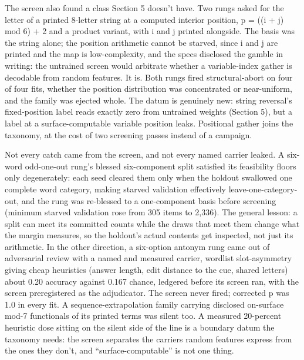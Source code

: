 The screen also found a class Section 5 doesn't have. Two rungs asked
for the letter of a printed 8-letter string at a computed interior
position, p = ((i + j) mod 6) + 2 and a product variant, with i and j
printed alongside. The basis was the string alone; the position
arithmetic cannot be starved, since i and j are printed and the map
is low-complexity, and the specs disclosed the gamble in writing: the
untrained screen would arbitrate whether a variable-index gather is
decodable from random features. It is. Both rungs fired
structural-abort on four of four fits, whether the position
distribution was concentrated or near-uniform, and the family was
ejected whole. The datum is genuinely new: string reversal's
fixed-position label reads exactly zero from untrained weights
(Section 5), but a label at a surface-computable variable position
leaks. Positional gather joins the taxonomy, at the cost of two
screening passes instead of a campaign.

Not every catch came from the screen, and not every named carrier
leaked. A six-word odd-one-out rung's blessed six-component split
satisfied its feasibility floors only degenerately: each seed cleared
them only when the holdout swallowed one complete word category,
making starved validation effectively leave-one-category-out, and the
rung was re-blessed to a one-component basis before screening
(minimum starved validation rose from 305 items to 2,336). The
general lesson: a split can meet its committed counts while the draws
that meet them change what the margin measures, so the holdout's
actual contents get inspected, not just its arithmetic. In the other
direction, a six-option antonym rung came out of adversarial review
with a named and measured carrier, wordlist slot-asymmetry giving
cheap heuristics (answer length, edit distance to the cue, shared
letters) about 0.20 accuracy against 0.167 chance, ledgered before
its screen ran, with the screen preregistered as the adjudicator. The
screen never fired; corrected p was 1.0 in every fit. A
sequence-extrapolation family carrying disclosed on-surface mod-7
functionals of its printed terms was silent too. A measured
20-percent heuristic dose sitting on the silent side of the line is a
boundary datum the taxonomy needs: the screen separates the carriers
random features express from the ones they don't, and
``surface-computable'' is not one thing.

